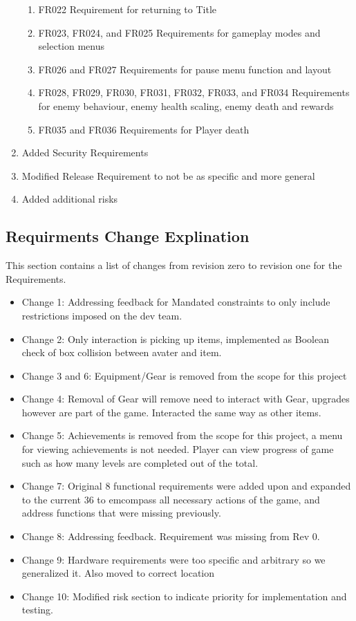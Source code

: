 \documentclass[]{article}
\begin{document}
\begin{enumerate}
\begin{enumerate}
		\item FR022 Requirement for returning to Title
		\item FR023, FR024, and FR025 Requirements for gameplay modes and selection menus
		\item FR026 and FR027 Requirements for pause menu function and layout
		\item FR028, FR029, FR030, FR031, FR032, FR033, and FR034 Requirements for enemy behaviour, enemy health scaling, enemy death and rewards
		\item FR035 and FR036 Requirements for Player death
	\end{enumerate}
        \item Added Security Requirements
        \item Modified Release Requirement to not be as specific and more general
        \item Added additional risks
    \end{enumerate}

\subsection*{Requirments Change Explination}
This section contains a list of changes from revision zero to revision one for the Requirements.
\begin{itemize}
		\item Change 1: Addressing feedback for Mandated constraints to only include restrictions imposed on the dev team.
		\item Change 2: Only interaction is picking up items, implemented as Boolean check of box collision between avater and item.
		\item Change 3 and 6: Equipment/Gear is removed from the scope for this project
		\item Change 4: Removal of Gear will remove need to interact with Gear, upgrades however are part of the game. Interacted the same way as other items.
		\item Change 5: Achievements is removed from the scope for this project, a menu for viewing achievements is not needed. Player can view progress of game such as how many levels are completed out of the total.
		\item Change 7: Original 8 functional requirements were added upon and expanded to the current 36 to emcompass all necessary actions of the game, and address functions that were missing previously.
		\item Change 8: Addressing feedback. Requirement was missing from Rev 0.
		\item Change 9: Hardware requirements were too specific and arbitrary so we generalized it. Also moved to correct location
		\item Change 10: Modified risk section to indicate priority for implementation and testing.
\end{itemize}
\end{document}
